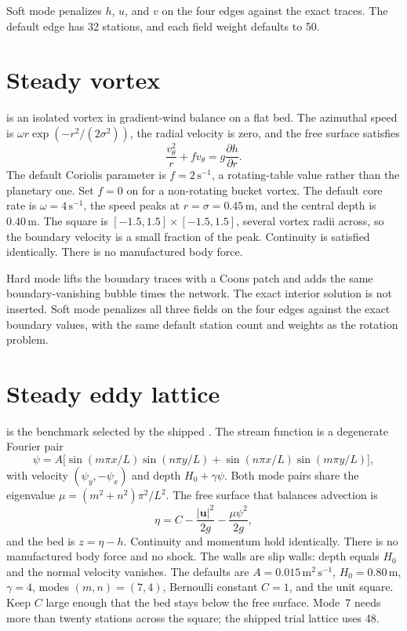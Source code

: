 Soft mode penalizes \(h\), \(u\), and \(v\) on the four edges against the exact traces.
The default edge has 32 stations, and each field weight defaults to 50.

\section{Steady vortex}

 is an isolated vortex in gradient-wind balance on a flat bed.
The azimuthal speed is \(\omega r \exp(-r^{2}/(2\sigma^{2}))\), the radial velocity is zero, and the free surface satisfies
\[
\frac{v_{\theta}^{2}}{r} + f v_{\theta} = g \frac{\partial h}{\partial r}.
\]
The default Coriolis parameter is \(f=2\,\mathrm{s^{-1}}\), a rotating-table value rather than the planetary one.
Set \(f=0\) on  for a non-rotating bucket vortex.
The default core rate is \(\omega=4\,\mathrm{s^{-1}}\), the speed peaks at \(r=\sigma=0.45\,\mathrm{m}\), and the central depth is \(0.40\,\mathrm{m}\).
The square is \([-1.5,1.5]\times[-1.5,1.5]\), several vortex radii across, so the boundary velocity is a small fraction of the peak.
Continuity is satisfied identically.
There is no manufactured body force.

Hard mode lifts the boundary traces with a Coons patch and adds the same boundary-vanishing bubble times the network.
The exact interior solution is not inserted.
Soft mode penalizes all three fields on the four edges against the exact boundary values, with the same default station count and weights as the rotation problem.

\section{Steady eddy lattice}

 is the benchmark selected by the shipped .
The stream function is a degenerate Fourier pair
\[
\psi = A \big[
\sin(m\pi x/L)\sin(n\pi y/L)
+ \sin(n\pi x/L)\sin(m\pi y/L)
\big],
\]
with velocity \((\psi_{y},-\psi_{x})\) and depth \(H_{0}+\gamma\psi\).
Both mode pairs share the eigenvalue \(\mu=(m^{2}+n^{2})\pi^{2}/L^{2}\).
The free surface that balances advection is
\[
\eta = C - \frac{|\mathbf{u}|^{2}}{2g} - \frac{\mu\psi^{2}}{2g},
\]
and the bed is \(z=\eta-h\).
Continuity and momentum hold identically.
There is no manufactured body force and no shock.
The walls are slip walls: depth equals \(H_{0}\) and the normal velocity vanishes.
The defaults are \(A=0.015\,\mathrm{m^{2}\,s^{-1}}\), \(H_{0}=0.80\,\mathrm{m}\), \(\gamma=4\), modes \((m,n)=(7,4)\), Bernoulli constant \(C=1\), and the unit square.
Keep \(C\) large enough that the bed stays below the free surface.
Mode~7 needs more than twenty stations across the square; the shipped trial lattice uses 48.

